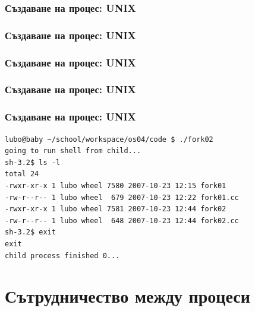 \documentclass[ignorenonframetext, hyperref=unicode]{beamer}
\begin{document}
\begin{frame}[containsverbatim]
\frametitle{Създаване на процес: UNIX}

\end{frame}

\begin{frame}[containsverbatim]
\frametitle{Създаване на процес: UNIX}

\end{frame}

\begin{frame}[containsverbatim]
\frametitle{Създаване на процес: UNIX}

\end{frame}

\begin{frame}[containsverbatim]
\frametitle{Създаване на процес: UNIX}

\end{frame}


\begin{frame}[containsverbatim]
\frametitle{Създаване на процес: UNIX}
\begin{verbatim}
lubo@baby ~/school/workspace/os04/code $ ./fork02 
going to run shell from child...
sh-3.2$ ls -l
total 24
-rwxr-xr-x 1 lubo wheel 7580 2007-10-23 12:15 fork01
-rw-r--r-- 1 lubo wheel  679 2007-10-23 12:22 fork01.cc
-rwxr-xr-x 1 lubo wheel 7581 2007-10-23 12:44 fork02
-rw-r--r-- 1 lubo wheel  648 2007-10-23 12:44 fork02.cc
sh-3.2$ exit
exit
child process finished 0...
\end{verbatim}
\end{frame}


\section{Сътрудничество между процеси}
\end{document}
